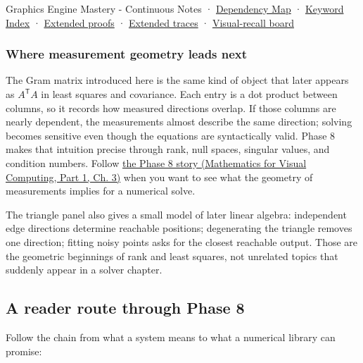 {Graphics Engine Mastery - Continuous Notes} · \hyperref[appendix-4ad47bdd269a]{Dependency Map} · \hyperref[appendix-a6d556a4ef50]{Keyword Index} · \hyperref[02-foundations-ii-ch039-phase-6---geometry-reconstruction-proofs]{Extended proofs} · \hyperref[appendix-92ff77d4dfdc-phase-6---the-robot-panel-tracebook]{Extended traces} · \hyperref[appendix-38d9c8aca357]{Visual-recall board}

\subsubsection{Where measurement geometry leads next}\label{02-foundations-ii-ch039-where-measurement-geometry-leads-next}

\hypertarget{02-foundations-ii-ch039-where-measurement-geometry-leads-next}{}

The Gram matrix introduced here is the same kind of object that later appears as \(A^\mathsf T A\) in least squares and covariance. Each entry is a dot product between columns, so it records how measured directions overlap. If those columns are nearly dependent, the measurements almost describe the same direction; solving becomes sensitive even though the equations are syntactically valid. Phase 8 makes that intuition precise through rank, null spaces, singular values, and condition numbers. Follow \href{../02-Mathematics-for-Visual-Computing-P01/main.pdf\#nameddest=01-foundations-i-ch019-the-graphics-problem-hiding-inside-a-matrix-equation}{the Phase 8 story (Mathematics for Visual Computing, Part 1, Ch. 3)} when you want to see what the geometry of measurements implies for a numerical solve.

The triangle panel also gives a small model of later linear algebra: independent edge directions determine reachable positions; degenerating the triangle removes one direction; fitting noisy points asks for the closest reachable output. Those are the geometric beginnings of rank and least squares, not unrelated topics that suddenly appear in a solver chapter.

\subsection{A reader route through Phase 8}\label{02-foundations-ii-ch039-a-reader-route-through-phase-8}

\hypertarget{02-foundations-ii-ch039-a-reader-route-through-phase-8}{}

Follow the chain from what a system means to what a numerical library can promise:

